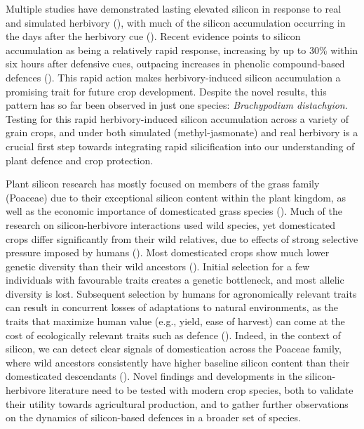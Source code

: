 \documentclass[12pt, letterpaper]{report}
\begin{document}
Multiple studies have demonstrated lasting elevated silicon in response to real and simulated herbivory (\cite{massey_are_2008,hartley_ecology_2016}), with much of the silicon accumulation occurring in the days after the herbivory cue (\cite{ye_priming_2013}). Recent evidence points to silicon accumulation as being a relatively rapid response, increasing by up to 30\% within six hours after defensive cues, outpacing increases in phenolic compound-based defences (\cite{waterman_short-term_2021}). This rapid action makes herbivory-induced silicon accumulation a promising trait for future crop development. Despite the novel results, this pattern has so far been observed in just one species: \textit{Brachypodium distachyion}. Testing for this rapid herbivory-induced silicon accumulation across a variety of grain crops, and under both simulated (methyl-jasmonate) and real herbivory is a crucial first step towards integrating rapid silicification into our understanding of plant defence and crop protection.

Plant silicon research has mostly focused on members of the grass family (Poaceae) due to their exceptional silicon content within the plant kingdom, as well as the economic importance of domesticated grass species (\cite{reynolds_silicon_2016}). Much of the research on silicon-herbivore interactions used wild species, yet domesticated crops differ significantly from their wild relatives, due to effects of strong selective pressure imposed by humans (\cite{chen_crop_2015}). Most domesticated crops show much lower genetic diversity than their wild ancestors (\cite{smith_domestication_2019,hafeez_creation_2021}). Initial selection for a few individuals with favourable traits creates a genetic bottleneck, and most allelic diversity is lost. Subsequent selection by humans for agronomically relevant traits can result in concurrent losses of adaptations to natural environments, as the traits that maximize human value (e.g., yield, ease of harvest) can come at the cost of ecologically relevant traits such as defence (\cite{chen_crop_2015,whitehead_domestication_2017}). Indeed, in the context of silicon, we can detect clear signals of domestication across the Poaceae family, where wild ancestors consistently have higher baseline silicon content than their domesticated descendants (\cite{simpson_still_2017}). Novel findings and developments in the silicon-herbivore literature need to be tested with modern crop species, both to validate their utility towards agricultural production, and to gather further observations on the dynamics of silicon-based defences in a broader set of species.
\end{document}
